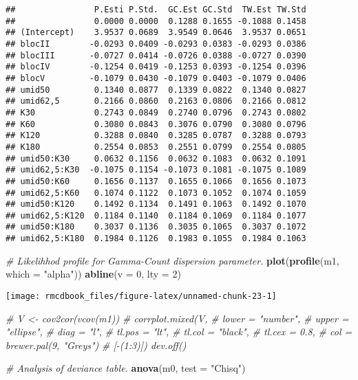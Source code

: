 \documentclass[9pt,a5paper,]{book}
\newenvironment{Shaded}{}{}
\newcommand{\KeywordTok}[1]{\textbf{{#1}}}
\newcommand{\DataTypeTok}[1]{\underline{{#1}}}
\newcommand{\DecValTok}[1]{{#1}}
\newcommand{\StringTok}[1]{{#1}}
\newcommand{\CommentTok}[1]{\textit{{#1}}}
\newcommand{\NormalTok}[1]{{#1}}
\renewenvironment{Shaded}{\color{inputcolor}}{}
\renewcommand{\DataTypeTok}[1]{{#1}}
\theoremstyle{definition}
\theoremstyle{definition}
\theoremstyle{remark}
\begin{document}
\begin{verbatim}
##                P.Esti P.Std.  GC.Est GC.Std  TW.Est TW.Std
##                0.0000 0.0000  0.1288 0.1655 -0.1088 0.1458
## (Intercept)    3.9537 0.0689  3.9549 0.0646  3.9537 0.0651
## blocII        -0.0293 0.0409 -0.0293 0.0383 -0.0293 0.0386
## blocIII       -0.0727 0.0414 -0.0726 0.0388 -0.0727 0.0390
## blocIV        -0.1254 0.0419 -0.1253 0.0393 -0.1254 0.0396
## blocV         -0.1079 0.0430 -0.1079 0.0403 -0.1079 0.0406
## umid50         0.1340 0.0877  0.1339 0.0822  0.1340 0.0827
## umid62,5       0.2166 0.0860  0.2163 0.0806  0.2166 0.0812
## K30            0.2743 0.0849  0.2740 0.0796  0.2743 0.0802
## K60            0.3080 0.0843  0.3076 0.0790  0.3080 0.0796
## K120           0.3288 0.0840  0.3285 0.0787  0.3288 0.0793
## K180           0.2554 0.0853  0.2551 0.0799  0.2554 0.0805
## umid50:K30     0.0632 0.1156  0.0632 0.1083  0.0632 0.1091
## umid62,5:K30  -0.1075 0.1154 -0.1073 0.1081 -0.1075 0.1089
## umid50:K60     0.1656 0.1137  0.1655 0.1066  0.1656 0.1073
## umid62,5:K60   0.1074 0.1122  0.1073 0.1052  0.1074 0.1059
## umid50:K120    0.1492 0.1134  0.1491 0.1063  0.1492 0.1070
## umid62,5:K120  0.1184 0.1140  0.1184 0.1069  0.1184 0.1077
## umid50:K180    0.3037 0.1136  0.3035 0.1065  0.3037 0.1072
## umid62,5:K180  0.1984 0.1126  0.1983 0.1055  0.1984 0.1063
\end{verbatim}

\begin{Shaded}
\begin{Highlighting}[]
\CommentTok{# Likelihhod profile for Gamma-Count dispersion parameter.}
\KeywordTok{plot}\NormalTok{(}\KeywordTok{profile}\NormalTok{(m1, }\DataTypeTok{which =} \StringTok{"alpha"}\NormalTok{))}
\KeywordTok{abline}\NormalTok{(}\DataTypeTok{v =} \DecValTok{0}\NormalTok{, }\DataTypeTok{lty =} \DecValTok{2}\NormalTok{)}
\end{Highlighting}
\end{Shaded}

\begin{center}\texttt{[image: rmcdbook\_files/figure-latex/unnamed-chunk-23-1]} \end{center}

\begin{Shaded}
\begin{Highlighting}[]
\CommentTok{# V <- cov2cor(vcov(m1))}
\CommentTok{# corrplot.mixed(V,}
\CommentTok{#                lower = "number",}
\CommentTok{#                upper = "ellipse",}
\CommentTok{#                diag = "l",}
\CommentTok{#                tl.pos = "lt",}
\CommentTok{#                tl.col = "black",}
\CommentTok{#                tl.cex = 0.8,}
\CommentTok{#                col = brewer.pal(9, "Greys")}
\CommentTok{#                [-(1:3)]) dev.off()}

\CommentTok{# Analysis of deviance table.}
\KeywordTok{anova}\NormalTok{(m0, }\DataTypeTok{test =} \StringTok{"Chisq"}\NormalTok{)}
\end{Highlighting}
\end{Shaded}
\end{document}
